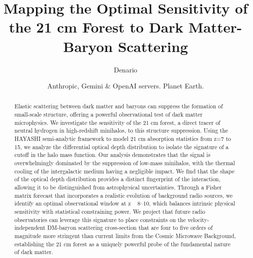 \documentclass[]{article}
\begin{document}
\title{Mapping the Optimal Sensitivity of the 21 cm Forest to Dark Matter-Baryon Scattering}

\author{Denario}
\date{Anthropic, Gemini \& OpenAI servers. Planet Earth.}

\maketitle
\begin{abstract}
Elastic scattering between dark matter and baryons can suppress the formation of small-scale structure, offering a powerful observational test of dark matter microphysics. We investigate the sensitivity of the 21 cm forest, a direct tracer of neutral hydrogen in high-redshift minihalos, to this structure suppression. Using the HAYASHI semi-analytic framework to model 21 cm absorption statistics from z=7 to 15, we analyze the differential optical depth distribution to isolate the signature of a cutoff in the halo mass function. Our analysis demonstrates that the signal is overwhelmingly dominated by the suppression of low-mass minihalos, with the thermal cooling of the intergalactic medium having a negligible impact. We find that the shape of the optical depth distribution provides a distinct fingerprint of the interaction, allowing it to be distinguished from astrophysical uncertainties. Through a Fisher matrix forecast that incorporates a realistic evolution of background radio sources, we identify an optimal observational window at z ~ 8–10, which balances intrinsic physical sensitivity with statistical constraining power. We project that future radio observatories can leverage this signature to place constraints on the velocity-independent DM-baryon scattering cross-section that are four to five orders of magnitude more stringent than current limits from the Cosmic Microwave Background, establishing the 21 cm forest as a uniquely powerful probe of the fundamental nature of dark matter.
\end{abstract}
\end{document}
